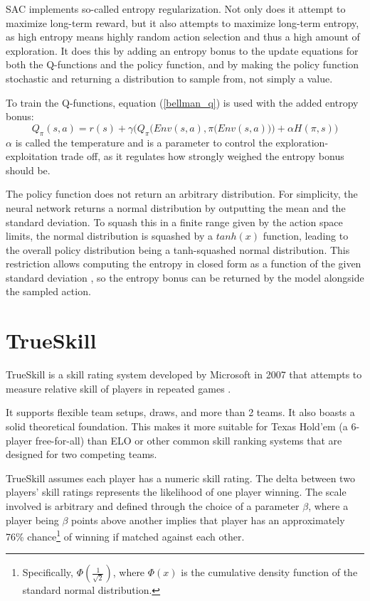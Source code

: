 SAC implements so-called entropy regularization. Not only does it attempt to maximize long-term reward, but it also attempts to maximize long-term entropy, as high entropy means highly random action selection and thus a high amount of exploration. It does this by adding an entropy bonus to the update equations for both the Q-functions and the policy function, and by making the policy function stochastic and returning a distribution to sample from, not simply a value.

To train the Q-functions, equation (\ref{bellman_q}) is used with the added entropy bonus:
\begin{equation}
    Q_{\pi}(s, a) = r(s) + \gamma \bigg(Q_{\pi}\Big(Env(s, a), \pi\big(Env(s, a)\big)\Big) + \alpha H(\pi, s)\bigg)
\end{equation}
$\alpha$ is called the temperature and is a parameter to control the exploration-exploitation trade off, as it regulates how strongly weighed the entropy bonus should be.

The policy function does not return an arbitrary distribution. For simplicity, the neural network returns a normal distribution by outputting the mean and the standard deviation. To squash this in a finite range given by the action space limits, the normal distribution is squashed by a $tanh(x)$ function, leading to the overall policy distribution being a tanh-squashed normal distribution. This restriction allows computing the entropy in closed form as a function of the given standard deviation \cite[explained in detail in the code comments of the SpinningUp SAC implementation]{SpinningUp2018}, so the entropy bonus can be returned by the model alongside the sampled action.

\section{TrueSkill}

TrueSkill is a skill rating system developed by Microsoft in 2007 that attempts to measure relative skill of players in repeated games \cite{TrueSkill_original} \cite{TrueSkill_blog}.

It supports flexible team setups, draws, and more than 2 teams. It also boasts a solid theoretical foundation. This makes it more suitable for Texas Hold'em (a 6-player free-for-all) than ELO \cite{Elo} or other common skill ranking systems that are designed for two competing teams.

TrueSkill assumes each player has a numeric skill rating. The delta between two players' skill ratings represents the likelihood of one player winning. The scale involved is arbitrary and defined through the choice of a parameter $\beta$, where a player being $\beta$ points above another implies that player has an approximately 76\% chance\footnote{Specifically, $\Phi\left(\frac{1}{\sqrt{2}}\right)$, where $\Phi(x)$ is the cumulative density function of the standard normal distribution.} of winning if matched against each other.

